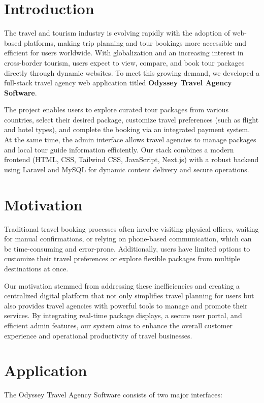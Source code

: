 \section{Introduction}
The travel and tourism industry is evolving rapidly with the adoption of web-based platforms, making trip planning and tour bookings more accessible and efficient for users worldwide. With globalization and an increasing interest in cross-border tourism, users expect to view, compare, and book tour packages directly through dynamic websites. To meet this growing demand, we developed a full-stack travel agency web application titled \textbf{Odyssey Travel Agency Software}. 

The project enables users to explore curated tour packages from various countries, select their desired package, customize travel preferences (such as flight and hotel types), and complete the booking via an integrated payment system. At the same time, the admin interface allows travel agencies to manage packages and local tour guide information efficiently. Our stack combines a modern frontend (HTML, CSS, Tailwind CSS, JavaScript, Next.js) with a robust backend using Laravel and MySQL for dynamic content delivery and secure operations.

\section{Motivation}
Traditional travel booking processes often involve visiting physical offices, waiting for manual confirmations, or relying on phone-based communication, which can be time-consuming and error-prone. Additionally, users have limited options to customize their travel preferences or explore flexible packages from multiple destinations at once.

Our motivation stemmed from addressing these inefficiencies and creating a centralized digital platform that not only simplifies travel planning for users but also provides travel agencies with powerful tools to manage and promote their services. By integrating real-time package displays, a secure user portal, and efficient admin features, our system aims to enhance the overall customer experience and operational productivity of travel businesses.

\section{Application}
The Odyssey Travel Agency Software consists of two major interfaces:

